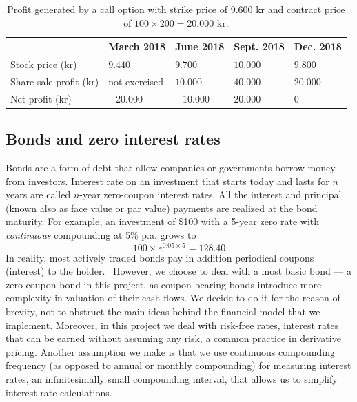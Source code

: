 \begin{table}[h]
\centering
\caption{Profit generated by a call option with strike price of 9.600 kr and contract price of $100 \times 200 = 20.000$ kr.}
\label{table:option-sell}
\begin{tabular}{|l|l|l|l|l|}
\hline
                       & March 2018    & June 2018 & Sept. 2018 & Dec. 2018 \\ \hline
Stock price (kr)       & $9.440$         & $9.700$     & $10.000$         & $9.800$         \\ \hline
Share sale profit (kr) & not exercised & $10.000$    & $40.000$         & $20.000$        \\ \hline
Net profit (kr)        & $-20.000$       & $-10.000$   & $20.000$         & $0$             \\ \hline
\end{tabular}
\end{table}

\subsection{Bonds and zero interest rates}
Bonds are a form of debt that allow companies or governments borrow money from investors. Interest rate on an investment that starts today and lasts for $n$ years are called $n$-year zero-coupon interest rates. All the interest and principal (known also as face value or par value) payments are realized at the bond maturity. For example, an investment of \$100 with a 5-year zero rate with \textit{continuous} compounding at 5\% p.a. grows to
\begin{equation*}
    100 \times e^{0.05 \times 5} = 128.40
\end{equation*}
In reality, most actively traded bonds pay in addition periodical coupons (interest) to the holder.~\cite[pg.80]{ofod} However, we choose to deal with a most basic bond --- a zero-coupon bond in this project, as coupon-bearing bonds introduce more complexity in valuation of their cash flows. We decide to do it for the reason of brevity, not to obstruct the main ideas behind the financial model that we implement. Moreover, in this project we deal with risk-free rates, interest rates that can be earned without assuming any risk, a common practice in derivative pricing. Another assumption we make is that we use continuous compounding frequency (as opposed to annual or monthly compounding) for measuring interest rates, an infinitesimally small compounding interval, that allows us to simplify interest rate calculations.~\cite[pg.76-79]{ofod}

